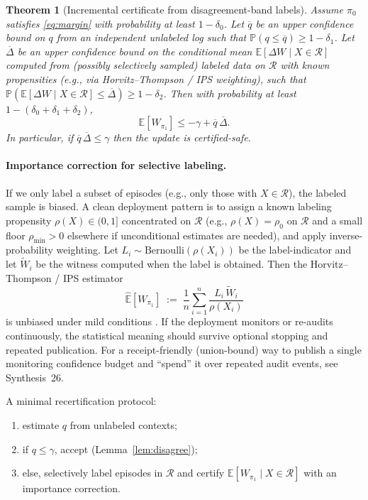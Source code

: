 \documentclass[11pt]{article}
\newtheorem{theorem}{Theorem}
\begin{document}
\begin{theorem}[Incremental certificate from disagreement-band labels]
\label{thm:incremental}
Assume $\pi_0$ satisfies \eqref{eq:margin} with probability at least $1-\delta_0$.
Let $\overline q$ be an upper confidence bound on $q$ from an independent unlabeled log such that $\mathbb{P}(q\le \overline q)\ge 1-\delta_1$.
Let $\overline{\Delta}$ be an upper confidence bound on the conditional mean $\mathbb{E}[\Delta W\mid X\in\mathcal{R}]$ computed from (possibly selectively sampled) labeled data on $\mathcal{R}$ with known propensities (e.g., via Horvitz--Thompson / IPS weighting), such that $\mathbb{P}(\mathbb{E}[\Delta W\mid X\in\mathcal{R}]\le \overline{\Delta})\ge 1-\delta_2$.
Then with probability at least $1-(\delta_0+\delta_1+\delta_2)$,
\[
\mathbb{E}[W_{\pi_1}] \le -\gamma + \overline q\,\overline{\Delta}.
\]
In particular, if $\overline q\,\overline{\Delta}\le \gamma$ then the update is certified-safe.
\end{theorem}


\paragraph{Importance correction for selective labeling.}
If we only label a subset of episodes (e.g., only those with $X\in\mathcal{R}$), the labeled sample is biased.
A clean deployment pattern is to assign a known labeling propensity $\rho(X)\in(0,1]$ concentrated on $\mathcal{R}$ (e.g., $\rho(X)=\rho_0$ on $\mathcal{R}$ and a small floor $\rho_{\min}>0$ elsewhere if unconditional estimates are needed), and apply inverse-probability weighting.
Let $L_i\sim\mathrm{Bernoulli}(\rho(X_i))$ be the label-indicator and let $\widetilde{W}_i$ be the witness computed when the label is obtained.
Then the Horvitz--Thompson / IPS estimator
\[
\widehat{\mathbb E}[W_{\pi_1}]\;:=\;\frac{1}{n}\sum_{i=1}^n \frac{L_i\,\widetilde{W}_i}{\rho(X_i)}
\]
is unbiased under mild conditions \cite{horvitz1952}.
If the deployment monitors or re-audits continuously, the statistical meaning should survive optional stopping and repeated publication.
For a receipt-friendly (union-bound) way to publish a single monitoring confidence budget and ``spend'' it over repeated audit events, see Synthesis~26.\cite{series:anytimespend}

A minimal recertification protocol:
\begin{enumerate}
  \item estimate $q$ from unlabeled contexts;
  \item if $q\le \gamma$, accept (Lemma~\ref{lem:disagree});
  \item else, selectively label episodes in $\mathcal{R}$ and certify $\mathbb{E}[W_{\pi_1}\mid X\in\mathcal{R}]$ with an importance correction.
\end{enumerate}
\end{document}
